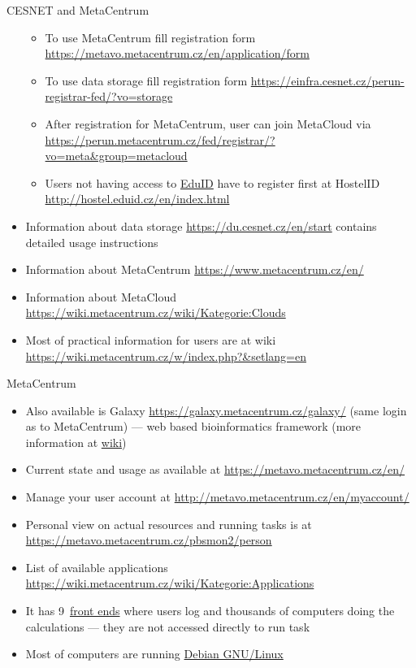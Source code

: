 \documentclass[compress, ucs, xelatex, 11pt, xcolor=svgnames, aspectratio=169,
	hyperref={
		bookmarks=true,
		unicode=true,
		colorlinks=true,
		pdftitle={Linux, command line and MetaCentrum},
		plainpages=false,
		pdfauthor={Vojtech Zeisek},
		pdfsubject={Course about use of Linux command line, writing shell scripts and using MetaCentrum of CESNET},
		pdfcreator={XeLaTeX},
		pdfkeywords={Linux, GNU, BASH, shell, command line, MetaCentrum},
		linkcolor=DarkRed, %
		anchorcolor=DarkBlue, %
		citecolor=Indigo, %
		filecolor=NavyBlue, %
		menucolor=DarkMagenta, %
		urlcolor=DarkBlue, %
		pdftex},
	url={hyphens, lowtilde} %
	]{beamer}
\begin{document}
\begin{frame}[allowframebreaks]{CESNET and MetaCentrum}
\begin{itemize}
\begin{itemize}
			\item To use MetaCentrum fill registration form \url{https://metavo.metacentrum.cz/en/application/form}
			\item To use data storage fill registration form \url{https://einfra.cesnet.cz/perun-registrar-fed/?vo=storage}
			\item After registration for MetaCentrum, user can join MetaCloud via \url{https://perun.metacentrum.cz/fed/registrar/?vo=meta&group=metacloud}
			\item Users not having access to \href{https://www.eduid.cz/en/index}{EduID} have to register first at HostelID \url{http://hostel.eduid.cz/en/index.html}
		\end{itemize}
		\item Information about data storage \url{https://du.cesnet.cz/en/start} contains detailed usage instructions
		\item Information about MetaCentrum \url{https://www.metacentrum.cz/en/}
		\item Information about MetaCloud \url{https://wiki.metacentrum.cz/wiki/Kategorie:Clouds}
		\item Most of practical information for users are at wiki \url{https://wiki.metacentrum.cz/w/index.php?&setlang=en}
	\end{itemize}
\end{frame}

\begin{frame}{MetaCentrum}
	\begin{itemize}
		\item Also available is Galaxy \url{https://galaxy.metacentrum.cz/galaxy/} (same login as to MetaCentrum) --- web based bioinformatics framework (more information at \href{https://wiki.metacentrum.cz/wiki/Galaxy}{wiki})
		\item Current state and usage as available at \url{https://metavo.metacentrum.cz/en/}
		\item Manage your user account at \url{http://metavo.metacentrum.cz/en/myaccount/}
		\item Personal view on actual resources and running tasks is at \url{https://metavo.metacentrum.cz/pbsmon2/person}
		\item List of available applications \url{https://wiki.metacentrum.cz/wiki/Kategorie:Applications}
		\item It has 9~\href{https://wiki.metacentrum.cz/wiki/Frontend}{front ends} where users log and thousands of computers doing the calculations --- they are not accessed directly to run task
		\item Most of computers are running \href{https://www.debian.org/}{Debian GNU/Linux}
	\end{itemize}
\end{frame}
\end{document}
